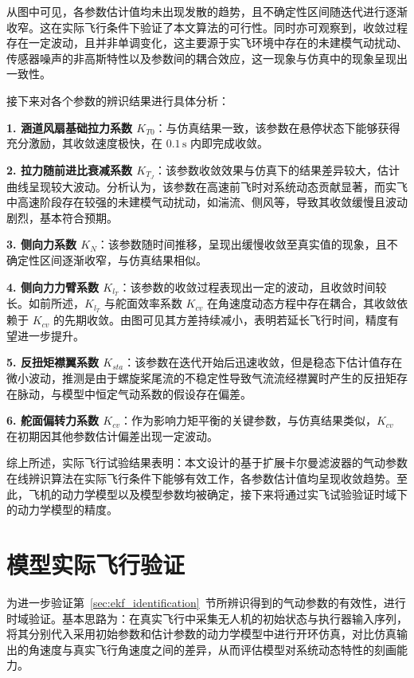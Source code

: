 从图中可见，各参数估计值均未出现发散的趋势，且不确定性区间随迭代进行逐渐收窄。这在实际飞行条件下验证了本文算法的可行性。同时亦可观察到，收敛过程存在一定波动，且并非单调变化，这主要源于实飞环境中存在的未建模气动扰动、传感器噪声的非高斯特性以及参数间的耦合效应，这一现象与仿真中的现象呈现出一致性。

接下来对各个参数的辨识结果进行具体分析：

\textbf{1. 涵道风扇基础拉力系数 \(K_{T0}\)}：与仿真结果一致，该参数在悬停状态下能够获得充分激励，其收敛速度极快，在 \(0.1\,\mathrm{s}\) 内即完成收敛。
    
\textbf{2. 拉力随前进比衰减系数 \(K_{T_J}\)}：该参数收敛效果与仿真下的结果差异较大，估计曲线呈现较大波动。分析认为，该参数在高速前飞时对系统动态贡献显著，而实飞中高速阶段存在较强的未建模气动扰动，如湍流、侧风等，导致其收敛缓慢且波动剧烈，基本符合预期。

\textbf{3. 侧向力系数 \(K_{N}\)}：该参数随时间推移，呈现出缓慢收敛至真实值的现象，且不确定性区间逐渐收窄，与仿真结果相似。

\textbf{4. 侧向力力臂系数 \(K_{l_T}\)}：该参数的收敛过程表现出一定的波动，且收敛时间较长。如前所述，\(K_{l_T}\) 与舵面效率系数 \(K_{cv}\) 在角速度动态方程中存在耦合，其收敛依赖于 \(K_{cv}\) 的先期收敛。由图可见其方差持续减小，表明若延长飞行时间，精度有望进一步提升。

\textbf{5. 反扭矩襟翼系数 \(K_{sta}\)}：该参数在迭代开始后迅速收敛，但是稳态下估计值存在微小波动，推测是由于螺旋桨尾流的不稳定性导致气流流经襟翼时产生的反扭矩存在脉动，与模型中恒定气动系数的假设存在偏差。

\textbf{6. 舵面偏转力系数 \(K_{cv}\)}：作为影响力矩平衡的关键参数，与仿真结果类似，\(K_{cv}\) 在初期因其他参数估计偏差出现一定波动。

综上所述，实际飞行试验结果表明：本文设计的基于扩展卡尔曼滤波器的气动参数在线辨识算法在实际飞行条件下能够有效工作，各参数估计值均呈现收敛趋势。至此，飞机的动力学模型以及模型参数均被确定，接下来将通过实飞试验验证时域下的动力学模型的精度。

\section{模型实际飞行验证}
为进一步验证第~\ref{sec:ekf_identification}~节所辨识得到的气动参数的有效性，进行时域验证。基本思路为：在真实飞行中采集无人机的初始状态与执行器输入序列，将其分别代入采用初始参数和估计参数的动力学模型中进行开环仿真，对比仿真输出的角速度与真实飞行角速度之间的差异，从而评估模型对系统动态特性的刻画能力。

